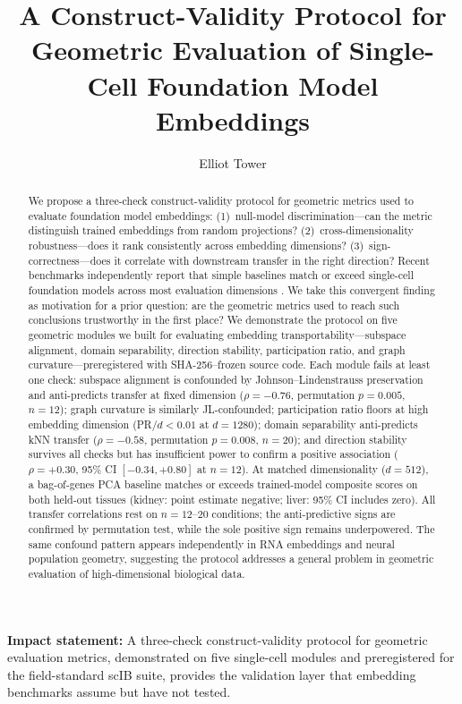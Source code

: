 \documentclass[9pt,lineno]{elife}
\title{A Construct-Validity Protocol for Geometric Evaluation of Single-Cell Foundation Model Embeddings}
\author[1]{Elliot Tower}
\affil[1]{Independent Researcher}
\begin{document}
\maketitle

\begin{abstract}
We propose a three-check construct-validity protocol for geometric metrics used to evaluate foundation model embeddings: (1)~null-model discrimination---can the metric distinguish trained embeddings from random projections? (2)~cross-dimensionality robustness---does it rank consistently across embedding dimensions? (3)~sign-correctness---does it correlate with downstream transfer in the right direction? Recent benchmarks independently report that simple baselines match or exceed single-cell foundation models across most evaluation dimensions \citep{vcbench2026, unifiedscfm2026, cellxgeneintegration2026}. We take this convergent finding as motivation for a prior question: are the geometric metrics used to reach such conclusions trustworthy in the first place? We demonstrate the protocol on five geometric modules we built for evaluating embedding transportability---subspace alignment, domain separability, direction stability, participation ratio, and graph curvature---preregistered with SHA-256--frozen source code. Each module fails at least one check: subspace alignment is confounded by Johnson--Lindenstrauss preservation and anti-predicts transfer at fixed dimension ($\rho = -0.76$, permutation $p = 0.005$, $n = 12$); graph curvature is similarly JL-confounded; participation ratio floors at high embedding dimension (PR$/d < 0.01$ at $d = 1280$); domain separability anti-predicts kNN transfer ($\rho = -0.58$, permutation $p = 0.008$, $n = 20$); and direction stability survives all checks but has insufficient power to confirm a positive association ($\rho = +0.30$, 95\% CI $[-0.34, +0.80]$ at $n = 12$). At matched dimensionality ($d = 512$), a bag-of-genes PCA baseline matches or exceeds trained-model composite scores on both held-out tissues (kidney: point estimate negative; liver: 95\% CI includes zero). All transfer correlations rest on $n = 12$--$20$ conditions; the anti-predictive signs are confirmed by permutation test, while the sole positive sign remains underpowered. The same confound pattern appears independently in RNA embeddings and neural population geometry, suggesting the protocol addresses a general problem in geometric evaluation of high-dimensional biological data.
\end{abstract}

\noindent\textbf{Impact statement:} A three-check construct-validity protocol for geometric evaluation metrics, demonstrated on five single-cell modules and preregistered for the field-standard scIB suite, provides the validation layer that embedding benchmarks assume but have not tested.
\end{document}
